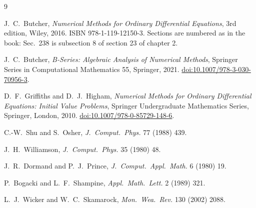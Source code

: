 \begin{thebibliography}{9}

J.~C.~Butcher, \emph{Numerical Methods for Ordinary Differential Equations},
3rd edition, Wiley, 2016. ISBN 978-1-119-12150-3.
Sections are numbered as in the book: Sec.~238 is subsection 8 of
section 23 of chapter 2.

J.~C.~Butcher, \emph{B-Series: Algebraic Analysis of Numerical Methods},
Springer Series in Computational Mathematics 55, Springer, 2021.
\href{https://doi.org/10.1007/978-3-030-70956-3}{doi:10.1007/978-3-030-70956-3}.

D.~F.~Griffiths and D.~J.~Higham, \emph{Numerical Methods for Ordinary
Differential Equations: Initial Value Problems}, Springer Undergraduate
Mathematics Series, Springer, London, 2010.
\href{https://doi.org/10.1007/978-0-85729-148-6}{doi:10.1007/978-0-85729-148-6}.

C.-W.~Shu and S.~Osher, \emph{J.\ Comput.\ Phys.} 77 (1988) 439.

J.~H.~Williamson, \emph{J.\ Comput.\ Phys.} 35 (1980) 48.

J.~R.~Dormand and P.~J.~Prince, \emph{J.\ Comput.\ Appl.\ Math.} 6 (1980) 19.

P.~Bogacki and L.~F.~Shampine, \emph{Appl.\ Math.\ Lett.} 2 (1989) 321.

L.~J.~Wicker and W.~C.~Skamarock, \emph{Mon.\ Wea.\ Rev.} 130 (2002) 2088.

\end{thebibliography}
